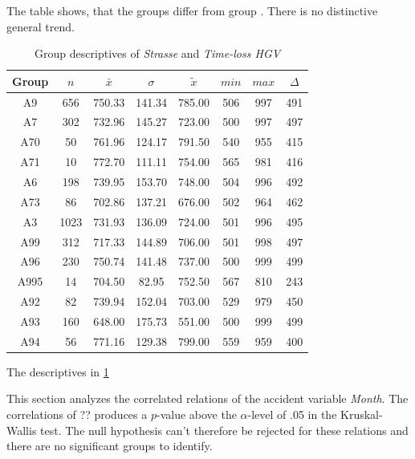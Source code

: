 The table shows, that the groups differ from group . There is no distinctive general trend.
\begin{table}[ht!]
	\tiny
	\centering
	\begin{tabular}{c|c|c|c|c|c|c|c}
		\toprule
		Group & $n$ & $\bar{x}$ & $\sigma$ & $\tilde{x}$ & $min$ & $max$ & $\Delta$ \\
		\midrule
		A9   & 656  & 750.33 & 141.34 & 785.00 & 506 & 997 & 491 \\ 
		A7   & 302  & 732.96 & 145.27 & 723.00 & 500 & 997 & 497 \\ 
		A70  & 50   & 761.96 & 124.17 & 791.50 & 540 & 955 & 415 \\ 
		A71  & 10   & 772.70 & 111.11 & 754.00 & 565 & 981 & 416 \\ 
		A6   & 198  & 739.95 & 153.70 & 748.00 & 504 & 996 & 492 \\ 
		A73  & 86   & 702.86 & 137.21 & 676.00 & 502 & 964 & 462 \\ 
		A3   & 1023 & 731.93 & 136.09 & 724.00 & 501 & 996 & 495 \\ 
		A99  & 312  & 717.33 & 144.89 & 706.00 & 501 & 998 & 497 \\ 
		A96  & 230  & 750.74 & 141.48 & 737.00 & 500 & 999 & 499 \\ 
		A995 & 14   & 704.50 & 82.95  & 752.50 & 567 & 810 & 243 \\ 
		A92  & 82   & 739.94 & 152.04 & 703.00 & 529 & 979 & 450 \\ 
		A93  & 160  & 648.00 & 175.73 & 551.00 & 500 & 999 & 499 \\ 
		A94  & 56   & 771.16 & 129.38 & 799.00 & 559 & 959 & 400 \\ 
		\bottomrule
	\end{tabular}
	\caption{Group descriptives of \textit{Strasse} and \textit{Time-loss HGV}}
	\label{tbl:descriptives_arbis_matched_Strasse_TMax}
\end{table}
The descriptives in \cref{tbl:descriptives_arbis_matched_Strasse_TMax}

This section analyzes the correlated relations of the accident variable \textit{Month}. The correlations of ?? produces a $p$-value above the $\alpha$-level of .05 in the Kruskal-Wallis test. The null hypothesis can't therefore be rejected for these relations and there are no significant groups to identify.


